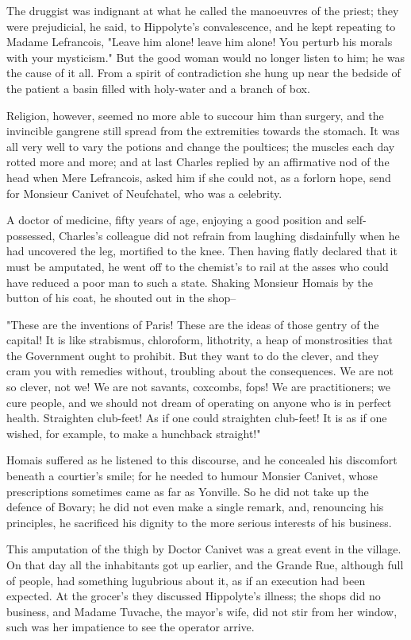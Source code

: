 \documentclass{tufte-book}
\begin{document}
The druggist was indignant at what he called the manoeuvres of the
priest; they were prejudicial, he said, to Hippolyte's convalescence,
and he kept repeating to Madame Lefrancois, "Leave him alone! leave him
alone! You perturb his morals with your mysticism." But the good woman
would no longer listen to him; he was the cause of it all. From a spirit
of contradiction she hung up near the bedside of the patient a basin
filled with holy-water and a branch of box.

Religion, however, seemed no more able to succour him than surgery, and
the invincible gangrene still spread from the extremities towards
the stomach. It was all very well to vary the potions and change the
poultices; the muscles each day rotted more and more; and at last
Charles replied by an affirmative nod of the head when Mere Lefrancois,
asked him if she could not, as a forlorn hope, send for Monsieur Canivet
of Neufchatel, who was a celebrity.

A doctor of medicine, fifty years of age, enjoying a good position
and self-possessed, Charles's colleague did not refrain from laughing
disdainfully when he had uncovered the leg, mortified to the knee. Then
having flatly declared that it must be amputated, he went off to the
chemist's to rail at the asses who could have reduced a poor man to such
a state. Shaking Monsieur Homais by the button of his coat, he shouted
out in the shop--

"These are the inventions of Paris! These are the ideas of those gentry
of the capital! It is like strabismus, chloroform, lithotrity, a heap of
monstrosities that the Government ought to prohibit. But they want to do
the clever, and they cram you with remedies without, troubling about
the consequences. We are not so clever, not we! We are not savants,
coxcombs, fops! We are practitioners; we cure people, and we should
not dream of operating on anyone who is in perfect health. Straighten
club-feet! As if one could straighten club-feet! It is as if one wished,
for example, to make a hunchback straight!"

Homais suffered as he listened to this discourse, and he concealed his
discomfort beneath a courtier's smile; for he needed to humour Monsier
Canivet, whose prescriptions sometimes came as far as Yonville. So he
did not take up the defence of Bovary; he did not even make a single
remark, and, renouncing his principles, he sacrificed his dignity to the
more serious interests of his business.

This amputation of the thigh by Doctor Canivet was a great event in the
village. On that day all the inhabitants got up earlier, and the Grande
Rue, although full of people, had something lugubrious about it, as
if an execution had been expected. At the grocer's they discussed
Hippolyte's illness; the shops did no business, and Madame Tuvache, the
mayor's wife, did not stir from her window, such was her impatience to
see the operator arrive.
\end{document}
